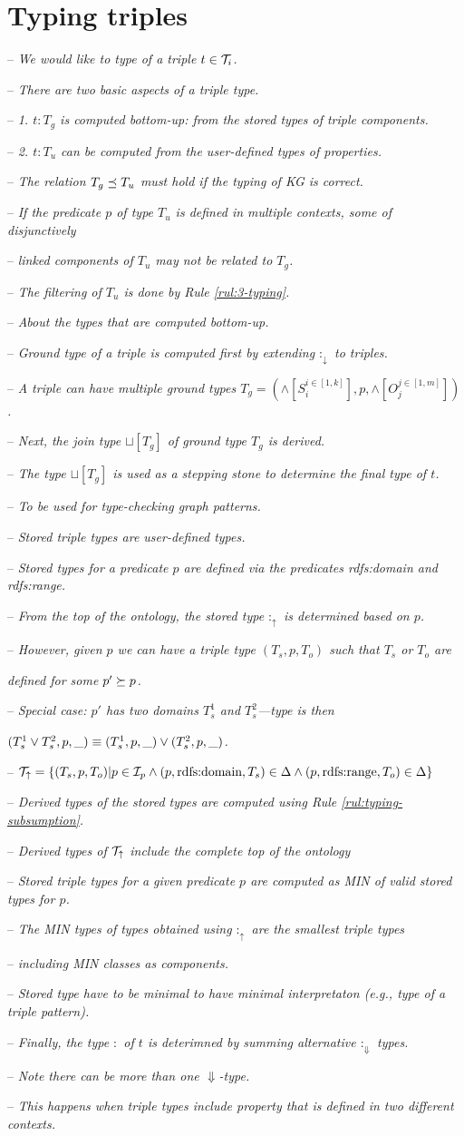 \documentclass[runningheads]{llncs}
\newcommand{\darr}{\downarrow}
\newcommand{\uarr}{\uparrow}
\newcommand{\Darr}{\Downarrow}
\newcommand{\I}{{\cal I}}
\newcommand{\T}{{\cal T}}
\newcommand{\notes}[1]{\noindent\begin{small}-- \emph{#1}\hfill\break\end{small}}
\newcommand{\nnotes}[1]{\indent\begin{small}-- \emph{#1}\hfill\break\end{small}}
\newcommand{\nnnotes}[1]{\indent\indent\begin{small}-- \emph{#1}\hfill\break\end{small}}
\newcommand{\anotes}[1]{\indent\begin{small}\phantom{-- }\emph{#1}\hfill\break\end{small}}
\begin{document}
\section{Typing triples\label{sec:triples}}


\notes{We would like to type of a triple $t\in\T_i$.}
\notes{There are two basic aspects of a triple type.}
\nnotes{1. $t:T_g$ is computed bottom-up: from the stored types of triple components.}
\nnotes{2. $t:T_u$ can be computed from the user-defined types of properties.}
\nnotes{The relation $T_g\preceq\/T_u$ must hold if the typing of KG is correct.}
\nnotes{If the predicate $p$ of type $T_u$ is defined in multiple contexts, some of disjunctively}
\nnotes{linked components of $T_u$ may not be related to $T_g$.}
\nnotes{The filtering of $T_u$ is done by Rule \ref{rul:3-typing}.}

\notes{About the types that are computed bottom-up.}
\nnotes{Ground type of a triple is computed first by extending $:_\darr$ to triples.}
\nnotes{A triple can have multiple ground types $T_g=(\land[S_i^{i\in[1,k]}],p,\land[O_j^{j\in[1,m]}])$.}
\nnotes{Next, the join type $\sqcup[T_g]$ of ground type $T_g$ is derived.}
\nnotes{The type $\sqcup[T_g]$ is used as a stepping stone to determine the final type of $t$.}
\nnnotes{To be used for type-checking graph patterns.}

\notes{Stored triple types are user-defined types.}
\nnotes{Stored types for a predicate $p$ are defined via the predicates rdfs:domain and rdfs:range.}
\nnotes{From the top of the ontology, the stored type $:_\uarr$ is determined based on $p$.}
\nnotes{However, given $p$ we can have a triple type $(T_s,p,T_o)$ such that $T_s$ or $T_o$ are}
\anotes{defined for some $p'\succeq\/p$.}
\nnotes{Special case: $p'$ has two domains $T_s^1$ and $T_s^2$---type is then}
\anotes{$(T_s^1\lor\/T_s^2,p,\_)\equiv\/(T_s^1,p,\_)\lor(T_s^2,p,\_)$.}
\nnotes{$\T_\uarr=\{(T_s,p,T_o)| p\in\I_p\land(p,\text{rdfs:domain},T_s)\in\Delta\land(p,\text{rdfs:range},T_o)\in\Delta\}$} 
\nnotes{Derived types of the stored types are computed using Rule \ref{rul:typing-subsumption}.}
\nnotes{Derived types of $\T_\uarr$ include the complete top of the ontology }

\notes{Stored triple types for a given predicate $p$ are computed as MIN of valid stored types for $p$.}
\nnotes{The MIN types of types obtained using $:_\uarr$ are the smallest triple types}
\nnotes{including MIN classes as components.}
\nnotes{Stored type have to be minimal to have minimal interpretaton (e.g., type of a triple pattern).}
\nnotes{Finally, the type $:$ of $t$ is deterimned by summing alternative $:_\Darr$ types.}
\nnotes{Note there can be more than one $\Darr$-type.}
\nnotes{This happens when triple types include property that is defined in two different contexts.}
\end{document}
